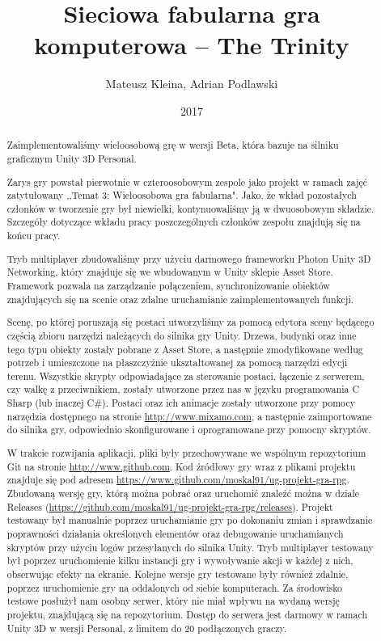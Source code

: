 \documentclass[openright]{xmgr}
\author   {Mateusz Kleina, Adrian Podlawski}
\title    {Sieciowa fabularna gra komputerowa -- The Trinity}
\date     {2017}
\begin{document}
\begin{abstract}
  Zaimplementowaliśmy wieloosobową grę w wersji Beta, która bazuje na silniku graficznym Unity 3D Personal.

  Zarys gry powstał pierwotnie w czteroosobowym zespole jako projekt w ramach zajęć zatytułowany ,,Temat 3: Wieloosobowa gra fabularna". Jako, że wkład pozostałych członków w tworzenie gry był niewielki, kontynuowaliśmy ją w dwuosobowym składzie. Szczegóły dotyczące wkładu pracy poszczególnych członków zespołu znajdują się na końcu pracy.
  
  Tryb multiplayer zbudowaliśmy przy użyciu darmowego frameworku Photon Unity 3D Networking, który znajduje się we wbudowanym w Unity sklepie Asset Store.
  Framework pozwala na zarządzanie połączeniem, synchronizowanie obiektów znajdujących się na scenie oraz zdalne uruchamianie zaimplementowanych funkcji.

  Scenę, po której poruszają się postaci utworzyliśmy za pomocą edytora sceny będącego częścią zbioru narzędzi należących do silnika gry Unity.
  Drzewa, budynki oraz inne tego typu obiekty zostały pobrane z Asset Store, a następnie zmodyfikowane według potrzeb i umieszczone na płaszczyźnie ukształtowanej za pomocą narzędzi edycji terenu.
  Wszystkie skrypty odpowiadające za sterowanie postaci, łączenie z serwerem, czy walkę z przeciwnikiem, zostały utworzone przez nas w języku programowania C Sharp (lub inaczej C\#).
  Postaci oraz ich animacje zostały utworzone przy pomocy narzędzia dostępnego na stronie \url{http://www.mixamo.com}, a następnie zaimportowane do silnika gry, odpowiednio skonfigurowane i oprogramowane przy pomocny skryptów.

  W trakcie rozwijania aplikacji, pliki były przechowywane we wspólnym repozytorium Git na stronie \url{http://www.github.com}. Kod źródłowy gry wraz z plikami projektu znajduje się pod adresem \url{https://www.github.com/moskal91/ug-projekt-gra-rpg}. Zbudowaną wersję gry, którą można pobrać oraz uruchomić znaleźć można w dziale Releases (\url{https://github.com/moskal91/ug-projekt-gra-rpg/releases}).
  Projekt testowany był manualnie poprzez uruchamianie gry po dokonaniu zmian i sprawdzanie poprawności działania określonych elementów oraz debugowanie uruchamianych skryptów przy użyciu logów przesyłanych do silnika Unity. Tryb multiplayer testowany był poprzez uruchomienie kilku instancji gry i wywoływanie akcji w każdej z nich, obserwując efekty na ekranie. Kolejne wersje gry testowane były również zdalnie, poprzez uruchomienie gry na oddalonych od siebie komputerach.
  Za środowisko testowe posłużył nam osobny serwer, który nie miał wpływu na wydaną wersję projektu, znajdującą się na repozytorium. Dostęp do serwera jest darmowy w ramach Unity 3D w wersji Personal, z limitem do 20 podłączonych graczy.
\end{abstract}
\end{document}
